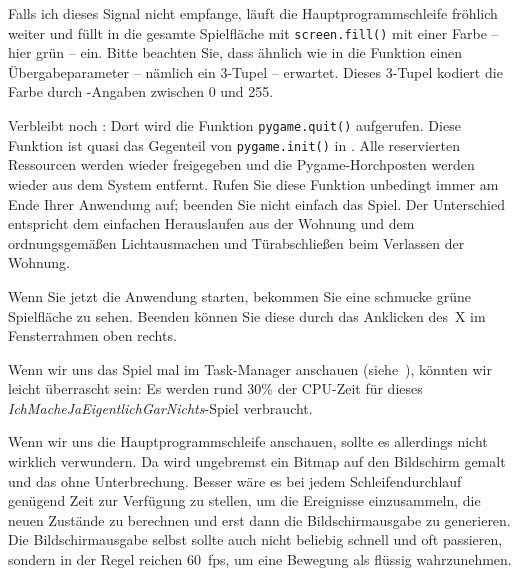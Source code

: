 Falls ich dieses Signal nicht empfange, läuft die Hauptprogrammschleife fröhlich weiter und füllt in  die gesamte Spielfläche mit \texttt{screen.fill()} mit einer Farbe -- hier grün -- ein. Bitte beachten Sie, dass ähnlich wie in  die Funktion einen Übergabeparameter -- nämlich ein 3-Tupel -- erwartet. Dieses 3-Tupel kodiert die Farbe durch -Angaben zwischen 0 und 255.

Verbleibt noch : Dort wird die Funktion \texttt{pygame.quit()} aufgerufen. Diese Funktion ist quasi das Gegenteil von \texttt{pygame.init()} in . Alle reservierten Ressourcen werden wieder freigegeben und die Pygame-Horchposten werden wieder aus dem System entfernt. Rufen Sie diese Funktion unbedingt immer am Ende Ihrer Anwendung auf; beenden Sie nicht einfach das Spiel. Der Unterschied entspricht dem einfachen Herauslaufen aus der Wohnung und dem ordnungsgemäßen Lichtausmachen und Türabschließen beim Verlassen der Wohnung.  

Wenn Sie jetzt die Anwendung starten, bekommen Sie eine schmucke grüne Spielfläche zu sehen. Beenden können Sie diese durch das Anklicken des~X im Fensterrahmen oben rechts.


Wenn wir uns das Spiel mal im Task-Manager anschauen (siehe~), könnten wir leicht überrascht sein: Es werden rund 30\% der CPU-Zeit für dieses \emph{IchMacheJaEigentlichGarNichts}-Spiel verbraucht. 


Wenn wir uns die Hauptprogrammschleife anschauen, sollte es allerdings nicht wirklich verwundern. Da wird ungebremst ein Bitmap auf den Bildschirm gemalt und das ohne Unterbrechung. Besser wäre es bei jedem Schleifendurchlauf genügend Zeit zur Verfügung zu stellen, um die Ereignisse einzusammeln, die neuen Zustände zu berechnen und erst dann die Bildschirmausgabe zu generieren. Die Bildschirmausgabe selbst sollte auch nicht beliebig schnell und oft passieren, sondern in der Regel reichen 60~\gls{fps}, um eine Bewegung als flüssig wahrzunehmen. 


